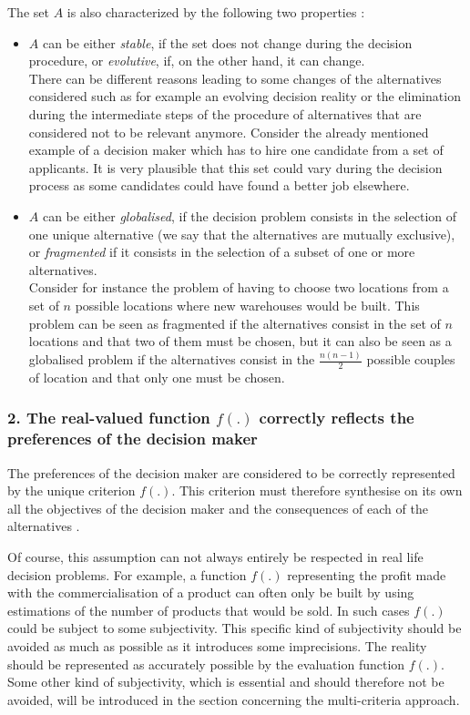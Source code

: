 The set $A$ is also characterized by the following two properties \cite{Vin92}: \\
\begin{itemize}
    \item $A$ can be either \textit{stable}, if the set does not change during the decision procedure, or \textit{evolutive}, if, on the other hand, it can change. \\
There can be different reasons leading to some changes of the alternatives considered such as for example an evolving decision reality or the elimination during the intermediate steps of the procedure of alternatives that are considered not to be relevant anymore.
Consider the already mentioned example of a decision maker which has to hire one candidate from a set of applicants. It is very plausible that this set could vary during the decision process as some candidates could have found a better job elsewhere.

    \item $A$ can be either \textit{globalised}, if the decision problem consists in the selection of one unique alternative (we say that the alternatives are mutually exclusive), or \textit{fragmented} if it consists in the selection of a subset of one or more alternatives.\\
Consider for instance the problem of having to choose two locations from a set of $n$ possible locations where new warehouses would be built. This problem can be seen as fragmented if the alternatives consist in the set of $n$ locations and that two of them must be chosen, but it can also be seen as a globalised problem if the alternatives consist in the $\frac{n(n-1)}{2}$ possible couples of location and that only one must be chosen.
\end{itemize}
\subsubsection{2. The real-valued function $f(.)$ correctly reflects the preferences of the decision maker \cite{ROY1990324}}

The preferences of the decision maker are considered to be correctly represented by the unique criterion $f(.)$. This criterion must therefore synthesise on its own all the objectives of the decision maker and the consequences of each of the alternatives \cite{ROY1990324} \cite{Bertrand2002}.

Of course, this assumption can not always entirely be respected in real life decision problems. For example, a function $f(.)$ representing the profit made with the commercialisation of a product can often only be built by using estimations of the number of products that would be sold.
In such cases $f(.)$ could be subject to some subjectivity.
This specific kind of subjectivity should be avoided as much as possible as it introduces some imprecisions. The reality should be represented as accurately possible by the evaluation function $f(.)$. 
Some other kind of subjectivity, which is essential and should therefore not be avoided, will be introduced in the section concerning the multi-criteria approach.

